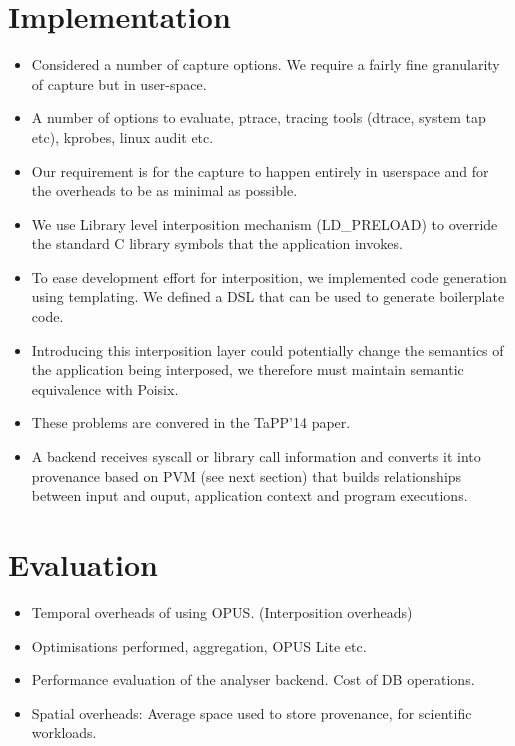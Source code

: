 \documentclass[withindex,glossary]{cam-thesis}
\begin{document}
\section{Implementation}
\begin{itemize}
\item Considered a number of capture options. We require a fairly fine granularity of capture but in user-space.
\item A number of options to evaluate, ptrace, tracing tools (dtrace, system tap etc), kprobes, linux audit etc.
\item Our requirement is for the capture to happen entirely in userspace and for the overheads to be as minimal as possible.
\item We use Library level interposition mechanism (LD\_PRELOAD) to override the standard C library symbols that the application invokes.
\item To ease development effort for interposition, we implemented code generation using templating. We defined a DSL that can be used to generate boilerplate code.
\item Introducing this interposition layer could potentially change the semantics of the application being interposed, we therefore must maintain semantic equivalence with Poisix.
\item These problems are convered in the TaPP'14 paper.
\item A backend receives syscall or library call information and converts it into provenance based on PVM (see next section) that builds relationships between input and ouput, application context and program executions.
\end{itemize}

\section{Evaluation}
\begin{itemize}
\item Temporal overheads of using OPUS. (Interposition overheads)
\item Optimisations performed, aggregation, OPUS Lite etc.
\item Performance evaluation of the analyser backend. Cost of DB operations.
\item Spatial overheads: Average space used to store provenance, for scientific workloads.
\end{itemize}
\end{document}
